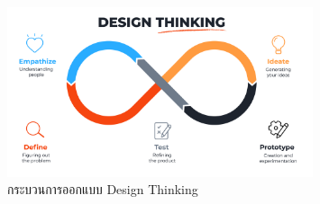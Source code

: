 \begin{enumerate}
          \begin{figure}
              \begin{center}
                  \includegraphics[width=0.8\textwidth]{img/design-thinking.png}
              \end{center}
              \caption[Poem]{กระบวนการออกแบบ Design Thinking}
              \label{fig:design-thinking}
          \end{figure}

\end{enumerate}







